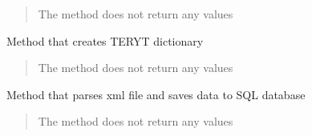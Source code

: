 \documentclass[letterpaper,10pt,english]{sphinxmanual}
\begin{document}
\begin{fulllineitems}
\begin{fulllineitems}
\begin{quote}
\begin{description}
\sphinxAtStartPar
{}

\sphinxAtStartPar
The method does not return any values

\end{description}\end{quote}

\end{fulllineitems}


\begin{fulllineitems}
\label{\detokenize{pcm_parser:pcm_parser.PRGDataParser.create_teryt_dict}}
\pysigstartsignatures
{}
\pysigstopsignatures
\sphinxAtStartPar
Method that creates TERYT dictionary
\begin{quote}\begin{description}
\sphinxAtStartPar
{}

\sphinxAtStartPar
The method does not return any values

\end{description}\end{quote}

\end{fulllineitems}


\begin{fulllineitems}
\label{\detokenize{pcm_parser:pcm_parser.PRGDataParser.parse_xml}}
\pysigstartsignatures
{}
\pysigstopsignatures
\sphinxAtStartPar
Method that parses xml file and saves data to SQL database
\begin{quote}\begin{description}
\sphinxAtStartPar
{}

\sphinxAtStartPar
The method does not return any values

\end{description}\end{quote}

\end{fulllineitems}


\end{fulllineitems}
\end{document}
